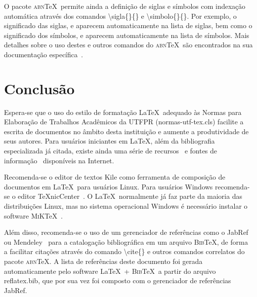 \documentclass[oneside]{normas-utf-tex} %
\begin{document}
O pacote \textsc{abn}\TeX\ permite ainda a defini\c{c}\~ao de siglas e s\'imbolos com indexa\c{c}\~ao autom\'atica atrav\'es dos comandos {\ttfamily \textbackslash sigla\{\}\{\}} e {\ttfamily \textbackslash simbolo\{\}\{\}}. Por exemplo, o significado das siglas, e aparecem automaticamente na lista de siglas, bem como o significado dos s\'imbolos, e aparecem automaticamente na lista de s\'imbolos. Mais detalhes sobre o uso destes e outros comandos do \textsc{abn}\TeX\ s\~ao encontrados na sua documenta\c{c}\~ao espec\'ifica~\cite{abnTeX2009}.


\chapter{Conclus\~ao}

Espera-se que o uso do estilo de formata\c{c}\~ao \LaTeX\ adequado \`as Normas para Elabora\c{c}\~ao de Trabalhos Acad\^emicos da UTFPR ({\ttfamily normas-utf-tex.cls}) facilite a escrita de documentos no \^ambito desta institui\c{c}\~ao e aumente a produtividade de seus autores. Para usu\'arios iniciantes em \LaTeX, al\'em da bibliografia especializada j\'a citada, existe ainda uma s\'erie de recursos~\cite{CTAN2009} e fontes de informa\c{c}\~ao~\cite{TeX-Br2009,Wikibooks2009} dispon\'iveis na Internet.

Recomenda-se o editor de textos Kile como ferramenta de composi\c{c}\~ao de documentos em \LaTeX\ para usu\'arios Linux. Para usu\'arios Windows recomenda-se o editor \TeX nicCenter~\cite{TeXnicCenter2009}. O \LaTeX\ normalmente j\'a faz parte da maioria das distribui\c{c}\~oes Linux, mas no sistema operacional Windows \'e necess\'ario instalar o software \textsc{MiK}\TeX~\cite{MiKTeX2009}.

Al\'em disso, recomenda-se o uso de um gerenciador de refer\^encias como o JabRef~\cite{JabRef2009} ou Mendeley~\cite{Mendeley2009} para a cataloga\c{c}\~ao bibliogr\'afica em um arquivo \textsc{Bib}\TeX, de forma a facilitar cita\c{c}\~oes atrav\'es do comando {\ttfamily \textbackslash cite\{\}} e outros comandos correlatos do pacote \textsc{abn}\TeX. A lista de refer\^encias deste documento foi gerada automaticamente pelo software \LaTeX\ + \textsc{Bib}\TeX\ a partir do arquivo {\ttfamily reflatex.bib}, que por sua vez foi composto com o gerenciador de refer\^encias JabRef.
\end{document}
